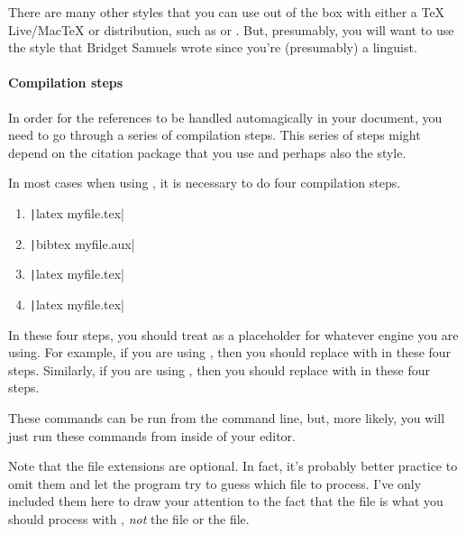 There are many other styles that you can use out of the box with either a TeX Live/{Mac\TeX} or  distribution, such as  or .
But, presumably, you will want to use the  style that Bridget Samuels wrote since you're (presumably) a linguist.

\paragraph{Compilation steps}

In order for the references to be handled automagically in your document, you need to go through a series of compilation steps.
This series of steps might depend on the citation package that you use and perhaps also the style.

In most cases when using , it is necessary to do four compilation steps.

\begin{enumerate}[label={(\roman*)}]

	\item{\texttt|latex myfile.tex|}
	
	\item{\texttt|bibtex myfile.aux|}
	
	\item{\texttt|latex myfile.tex|}
	
	\item{\texttt|latex myfile.tex|}

\end{enumerate}

In these four steps, you should treat  as a placeholder for whatever engine you are using.
For example, if you are using , then you should replace  with  in these four steps.
Similarly, if you are using , then you should replace  with  in these four steps.

These commands can be run from the command line, but, more likely, you will just run these commands from inside of your editor.

Note that the file extensions are optional.
In fact, it's probably better practice to omit them and let the program try to guess which file to process.
I've only included them here to draw your attention to the fact that the  file is what you should process with , \emph{not} the  file or the  file.


